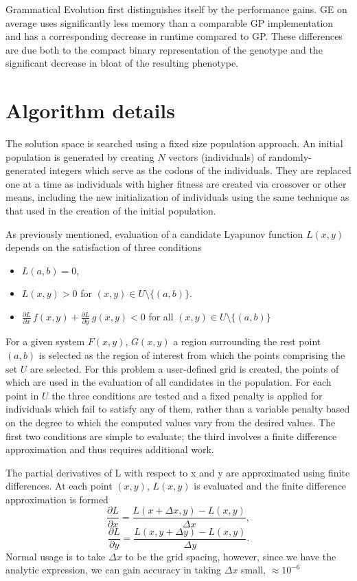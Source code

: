 \documentclass[12pt]{article}
\begin{document}
Grammatical Evolution first distinguishes itself by the performance
gains.  GE on average uses significantly less memory than a comparable
GP implementation and has a corresponding decrease in runtime compared to GP.  
These differences are due both to the compact binary representation of the
genotype and the significant decrease in bloat of the resulting phenotype.


\section{Algorithm details}


The solution space is searched using a fixed size population
approach. An initial population is generated by creating $N$ vectors
(individuals) of randomly-generated integers which serve as the codons
of the individuals.   They
are replaced one at a time as individuals with higher fitness are
created via crossover or other means, including the new initialization
of individuals using the same technique as that used in the creation
of the initial population.

As previously mentioned, evaluation of a candidate Lyapunov function $L(x,y)$
depends on the satisfaction of three conditions
\begin{itemize}
\item $L(a,b) = 0$,
\item  $L(x,y) > 0$ for $(x,y) \in U\setminus \{(a,b)\}$.
\item $\displaystyle \frac{\partial L}{\partial x}\, f(x,y) 
+ \frac{\partial L}{\partial y}\, g(x,y) < 0$ for all $(x,y) \in
U\setminus \{(a,b)\}$
\end{itemize}

For a given system $F(x,y)$, $G(x,y)$ a region surrounding the rest
point $(a,b)$ is selected as the region of interest from which the
points comprising the set $U$ are selected. For this problem a
user-defined grid is created, the points of which are used in the
evaluation of all candidates in the population. For each point in $U$
the three conditions are tested and a fixed penalty is applied for
individuals which fail to satisfy any of them, rather than a variable
penalty based on the degree to which the computed values vary from the
desired values.  The first two conditions are simple to evaluate; the
third involves a finite difference approximation and thus requires
additional work.

The partial derivatives of L with respect to x and y are approximated
using finite differences. At each point $(x,y)$, $L(x,y)$ is evaluated
and the finite difference approximation is formed
$$\frac{\partial L}{\partial x}
= \frac{L(x + \Delta x, y) - L(x,y)}{ \Delta x}, $$
$$\frac{\partial L}{\partial y} = \frac{L(x, y+\Delta y) - L(x,y)}{
  \Delta y}.$$ Normal usage is to take $\Delta x$ to be the grid
spacing, however, since we have the analytic expression, we can gain
accuracy in taking $\Delta x$ small, $ \approx 10^{-6}$
\end{document}
